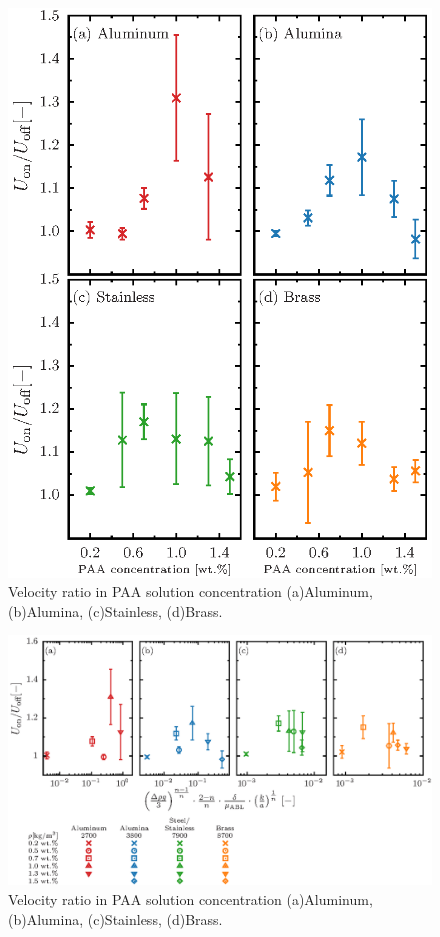 \begin{figure}[ht]
    \centering
    \includegraphics[width=1.0\textwidth]{./5-Results/concentrationUdiff.eps}
    \caption{Velocity ratio in PAA solution concentration (a)Aluminum, (b)Alumina, (c)Stainless, (d)Brass.}
    \label{fig:concentrationUdiff}
\end{figure}

\begin{figure}[ht]
    \centering
    \includegraphics[width=1.0\textwidth]{./5-Results/concentrationUdiff_each.eps}
    \caption{Velocity ratio in PAA solution concentration (a)Aluminum, (b)Alumina, (c)Stainless, (d)Brass.}
    \label{fig:concentrationUdiff2}
\end{figure}

